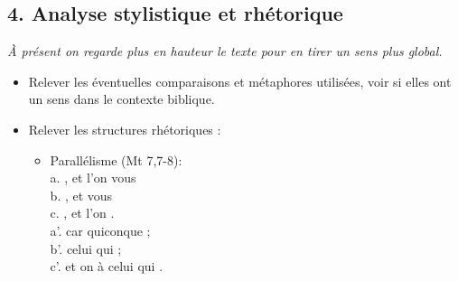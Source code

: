 \subsection*{4. Analyse stylistique et rhétorique}
\textit{À présent on regarde plus en hauteur le texte pour en tirer un sens plus global.}
\begin{itemize}[label=]
    \item Relever les éventuelles comparaisons et métaphores utilisées, voir si elles ont un sens dans le contexte biblique.
    \item Relever les structures rhétoriques :
          \begin{itemize}[label=]
              \item Parallélisme (Mt 7,7-8):\\
                    \decalage a. , et l’on vous \\
                    \decalage \decalage b. , et vous \\
                    \decalage \decalage \decalage c. , et l’on .\\
                    \decalage a’. car quiconque  ;\\
                    \decalage \decalage b’. celui qui  ;\\
                    \decalage \decalage \decalage c’. et on  à celui qui .\par


\end{itemize}
\end{itemize}
